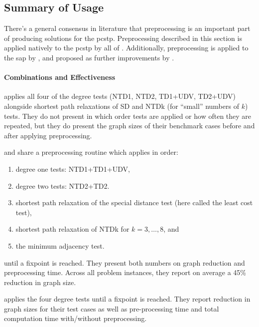  \subsection{Summary of Usage}\label{sec:pre:summary-usage}
There's a general consensus in literature that preprocessing is an important part of producing solutions
for the \gls{pcstp}. Preprocessing described in this section is applied natively to the \gls{pcstp}
by all of
\citet{lucena2004strong, Ljubic:2004:memetic, ljubic2005solving,akhmedov2016divide,gamrath2017scip}.
Additionally, preprocessing is applied to the \gls{sap} by \citet{leitner2016dual}, and proposed
as further improvements by \citet{fu2014knowledge}.

\paragraph{Combinations and Effectiveness}

\citet{lucena2004strong} applies all four of the degree tests (NTD1, NTD2, TD1+UDV, TD2+UDV)
alongside shortest path relaxations of SD and NTDk (for ``small'' numbers of $k$)
tests. They do not
present in which order tests are applied or how often they are repeated, but they
do present the graph sizes of their benchmark cases before and after applying preprocessing.

\citet{Ljubic:2004:memetic} and \citet{ljubic2005solving} share a preprocessing routine
 which applies in order:
\begin{enumerate}
\item degree one tests: NTD1+TD1+UDV,
\item degree two tests: NTD2+TD2.
\item shortest path relaxation of the special distance test (here called the least cost test),
\item shortest path relaxation of NTDk for $k = 3,\ldots,8$, and
\item the minimum adjacency test.
\end{enumerate}
until a fixpoint is reached. They present both numbers on graph reduction and preprocessing
time. Across all problem instances, they report on average
a 45\% reduction in graph size.

\citet{akhmedov2016divide} applies the four degree tests until a fixpoint is reached. They
report reduction in graph sizes for their test cases as well as pre-processing time and
total computation time with/without preprocessing.

